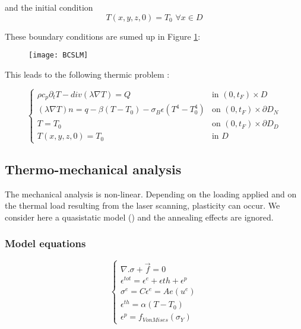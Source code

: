 \documentclass[11pt,a4paper]{article}
\begin{document}
\begin{itemize}
	 and the initial condition  
	 \begin{equation}
	 \label{eq:iniCondTemp}
	 T(x,y,z,0)=T_0 \,\, \forall x\in D
	 \end{equation}
	 
	 These boundary conditions are sumed up in Figure \ref{fig:BCSLM}:
	 
	 \begin{figure}
	 	\centering
	 	\texttt{[image: BCSLM]}
	 	\caption{}
	 	\label{fig:BCSLM}
	 \end{figure}
\end{itemize}

This leads to the following thermic problem :

\begin{equation}
\left\{
\begin{array}{ll}
\rho c_p\partial_tT-div(\lambda\nabla T)=Q  & \textrm{in}\,\,(0,t_F)\times D \\
(\lambda \nabla T)n=q-\beta (T-T_0)-\sigma_B\epsilon(T^4-T_0^4) & \textrm{on}\,\,(0,t_F)\times \partial D_N \\
T=T_0 &\textrm{on}\,\,(0,t_F)\times \partial D_D \\
T(x,y,z,0)=T_0 & \textrm{in}\,\,D
\end{array}
\right.
\end{equation}




	
\subsection{Thermo-mechanical analysis}

The mechanical analysis is non-linear. Depending on the loading applied and on the thermal load resulting from the laser scanning, plasticity can occur. We consider here a quasistatic model (\cite{MegahedMetaladditivemanufacturingprocess2016}) and the annealing effects are ignored.

\subsubsection*{Model equations}

\begin{equation}
\left\{
\begin{array}{l}
\nabla.\sigma+\vec{f}=0 \\
\epsilon^{tot}=\epsilon^e+\epsilon{th}+\epsilon^{p}\\
\sigma^e=C\epsilon^e=Ae(u^e) \\
\epsilon^{th}=\alpha(T-T_0)\\
\epsilon^{p}=f_{VonMises}(\sigma_Y)
\end{array}
\right.
\end{equation}
\end{document}
